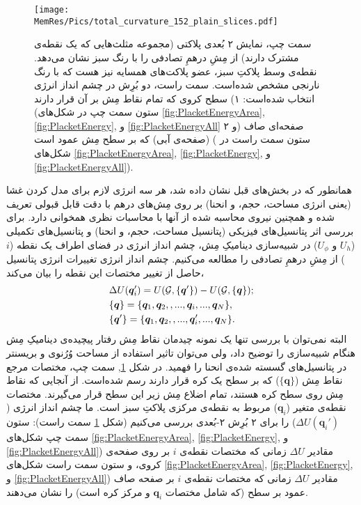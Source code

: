 \begin{figure}[h]
\begin{center}
\texttt{[image: \\MemRes/Pics/total\_curvature\_152\_plain\_slices.pdf]}
\caption{
سمت چپ، نمایش ۲ بُعدی پلاکتی (مجموعه مثلث‌هایی که یک نقطه‌ی مشترک دارند) از مِشِ درهمِ تصادفی را با رنگ سبز نشان می‌دهد. نقطه‌ی وسط پلاکتِ سبز، عضو پلاکت‌های همسایه‌ نیز هست که با رنگ نارنجی مشخص شده‌است. سمت راست، دو بُرِش در چشم انداز انرژی انتخاب شده‌است: ۱) سطح کروی که تمام نقاط مِش بر آن قرار دارند (ستون سمت چپ در شکل‌های
\ref{fig:PlacketEnergyArea}, \ref{fig:PlacketEnergy},
و
\ref{fig:PlacketEnergyAll}
و ۲)  صفحه‌ای صاف (صفحه‌ی آبی) که بر سطح مِش عمود است ( ستون سمت راست در شکل‌های 
\ref{fig:PlacketEnergyArea}, \ref{fig:PlacketEnergy},
و
\ref{fig:PlacketEnergyAll}).
}
\label{fig:PlacketRepresentaion}
\end{center}
\end{figure}
همانطور که در بخش‌های قبل نشان داده شد، هر سه انرژی لازم برای مدل کردن غشا (یعنی انرژی مساحت، حجم، و انحنا) بر روی مِش‌های درهم با دقت قابل قبولی تعریف شده و همچنین نیروی محاسبه شده از آنها با محاسبات نظری همخوانی دارد. برای بررسی اثر پتانسیل‌های فیزیکی (پتانسیل مساحت، حجم، و انحنا) و پتانسیل‌های تکمیلی 
($U_h$
و
$U_\phi$)
 در شبیه‌سازی دینامیکِ مِش، چشم انداز انرژی در فضای اطراف یک نقطه
 ($i$)
  از مِشِ درهمِ تصادفی را مطالعه می‌کنیم. چشم انداز انرژی تغییرات انرژی پتانسیل حاصل از تغییر مختصات این نقطه را بیان می‌کند،
  \begin{equation}
\begin{aligned}
&\Delta U(\bm q_{i}') = U({\cal G}, \{\bm q'\}) - U({\cal G}, \{\bm q\});\\
&\{\bm q\}=\{\bm q_1, \bm q_2, , ..., \bm q_{i},...,\bm q_N\},\\
&\{\bm q'\}=\{\bm q_1, \bm q_2, , ..., \bm q_{i}',...,\bm q_N\}.
\label{eq:energyLandscape}
\end{aligned}
\end{equation}
البته نمی‌توان با بررسی تنها یک نمونه چیدمان‌ نقاط مِش‌ رفتار پیچیده‌ی دینامیکِ مِش هنگام شبیه‌سازی را توضیح داد، ولی می‌توان تاثیر استفاده از مساحت وُرُنوی و بریسنتر در پتانسیل‌های گسسته شده‌ی انحنا را فهمید. در شکل 
\ref{fig:PlacketRepresentaion},
سمت چپ، مختصات مرجع نقاط مِش
($\{{\bm q}\}$)
که بر سطح یک کره قرار دارند رسم شده‌است. از آنجایی که نقاط مِش روی سطح کره هستند، تمام اضلاع مِش زیر این سطح قرار می‌گیرند. مختصات نقطه‌ی متغیر
(${\bm q_i}$)
مربوط به نقطه‌ی مرکزی پلاکتِ سبز است. ما چشم انداز انرژی 
($\Delta U({\bm q_i'})$)
را برای ۲ بُرِش ۲-بُعدی بررسی می‌کنیم (شکل
\ref{fig:PlacketRepresentaion}
سمت راست): ستون سمت چپ شکل‌های 
\ref{fig:PlacketEnergyArea}, \ref{fig:PlacketEnergy},
و
\ref{fig:PlacketEnergyAll})
مقادیر 
$\Delta U$
زمانی که مختصات نقطه‌ی 
$i$
بر روی صفحه‌ی کروی، و ستون سمت راست شکل‌های 
\ref{fig:PlacketEnergyArea}, \ref{fig:PlacketEnergy},
و
\ref{fig:PlacketEnergyAll})
مقادیر 
$\Delta U$
زمانی که مختصات نقطه‌ی 
$i$
بر صفحه صاف عمود بر سطح (که شامل مختصات
${\bm q_i}$
و مرکز کره است) را نشان می‌دهند.
 

